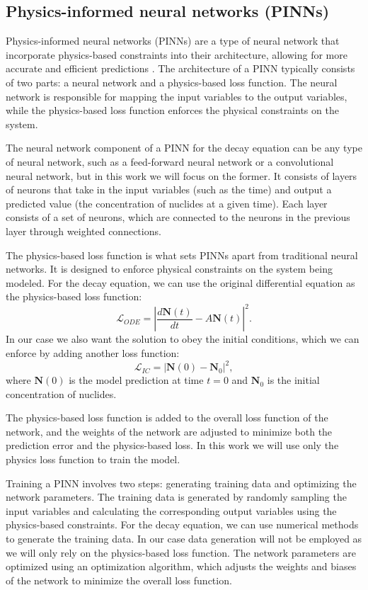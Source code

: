 \documentclass[10pt]{article}
\begin{document}
\subsection{Physics-informed neural networks (PINNs)}
Physics-informed neural networks (PINNs) are a type of neural network that incorporate physics-based constraints into their architecture, allowing for more accurate and efficient predictions \cite{cit:PINN}. The architecture of a PINN typically consists of two parts: a neural network and a physics-based loss function. The neural network is responsible for mapping the input variables to the output variables, while the physics-based loss function enforces the physical constraints on the system.

The neural network component of a PINN for the decay equation can be any type of neural network, such as a feed-forward neural network or a convolutional neural network, but in this work we will focus on the former. It consists of layers of neurons that take in the input variables (such as the time) and output a predicted value (the concentration of nuclides at a given time). Each layer consists of a set of neurons, which are connected to the neurons in the previous layer through weighted connections.

The physics-based loss function is what sets PINNs apart from traditional neural networks. It is designed to enforce physical constraints on the system being modeled. For the decay equation, we can use the original differential equation as the physics-based loss function:
\begin{equation*}
    \mathcal{L}_{ODE} = \left|\frac{d\mathbf{N}(t)}{dt} - A \mathbf{N}(t)\right|^2.
\end{equation*}
In our case we also want the solution to obey the initial conditions, which we can enforce by adding another loss function:
\begin{equation*}
    \mathcal{L}_{IC} = \left|\mathbf{N}(0) - \mathbf{N}_0\right|^2,
\end{equation*}
where $\mathbf{N}(0)$ is the model prediction at time $t = 0$ and $\mathbf{N}_0$ is the initial concentration of nuclides.

The physics-based loss function is added to the overall loss function of the network, and the weights of the network are adjusted to minimize both the prediction error and the physics-based loss. In this work we will use only the physics loss function to train the model.

Training a PINN involves two steps: generating training data and optimizing the network parameters. The training data is generated by randomly sampling the input variables and calculating the corresponding output variables using the physics-based constraints. For the decay equation, we can use numerical methods to generate the training data. In our case data generation will not be employed as we will only rely on the physics-based loss function. The network parameters are optimized using an optimization algorithm, which adjusts the weights and biases of the network to minimize the overall loss function.
\end{document}
